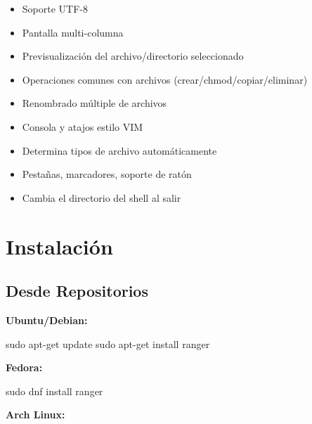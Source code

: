 \documentclass[
  doc,
  floatsintext,
  longtable,
  a4paper,
  nolmodern,
  notxfonts,
  notimes,
  12pt,
  colorlinks=true,linkcolor=blue,citecolor=blue,urlcolor=blue]{apa7}
\newenvironment{Shaded}{\begin{snugshade}}{\end{snugshade}}
\newcommand{\FunctionTok}[1]{\textcolor[rgb]{0.28,0.35,0.67}{#1}}
\newcommand{\NormalTok}[1]{\textcolor[rgb]{0.00,0.23,0.31}{#1}}
\providecommand{\tightlist}{%
  \setlength{\itemsep}{0pt}\setlength{\parskip}{0pt}}
\begin{document}
\begin{itemize}
\tightlist
\item
  Soporte UTF-8\\
\item
  Pantalla multi-columna\\
\item
  Previsualización del archivo/directorio seleccionado\\
\item
  Operaciones comunes con archivos (crear/chmod/copiar/eliminar)\\
\item
  Renombrado múltiple de archivos\\
\item
  Consola y atajos estilo VIM\\
\item
  Determina tipos de archivo automáticamente\\
\item
  Pestañas, marcadores, soporte de ratón\\
\item
  Cambia el directorio del shell al salir
\end{itemize}

\section{Instalación}\label{instalaciuxf3n}

\subsection{Desde Repositorios}\label{desde-repositorios}

\textbf{Ubuntu/Debian:}

\begin{Shaded}
\begin{Highlighting}[]
\FunctionTok{sudo}\NormalTok{ apt{-}get update}
\FunctionTok{sudo}\NormalTok{ apt{-}get install ranger}
\end{Highlighting}
\end{Shaded}

\textbf{Fedora:}

\begin{Shaded}
\begin{Highlighting}[]
\FunctionTok{sudo}\NormalTok{ dnf install ranger}
\end{Highlighting}
\end{Shaded}

\textbf{Arch Linux:}
\end{document}
